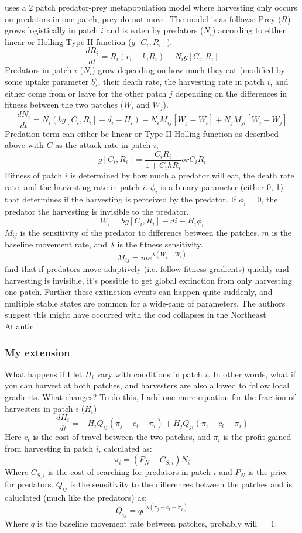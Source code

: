 \documentclass{article}\usepackage{graphicx, color}
\begin{document}
\cite{abramsetal:2012} uses a 2 patch predator-prey metapopulation model where harvesting only occurs on predators in one patch, prey do not move. The model is as follows:
Prey ($R$) grows logistically in patch $i$ and is eaten by predators ($N_i$) according to either linear or Holling Type II function ($g[C_i,R_i]$). 
\[\frac{dR_i}{dt}=R_i(r_i-k_iR_i)-N_ig[C_i,R_i]\]
Predators in patch $i$ ($N_i$) grow depending on how much they eat (modified by some uptake parameter $b$), their death rate, the harvesting rate in patch $i$, and either come from or leave for the other patch $j$ depending on the differences in fitness between the two patches ($W_i$ and $W_j$).
\[\frac{dN_i}{dt}=N_i(bg[C_i,R_i]-d_i-H_i)-N_iM_{ij}[W_j-W_i]+N_jM_{ji}[W_i-W_j]\]
Predation term can either be linear or Type II Holling function as described above with $C$ as the attack rate in patch $i$,
\[g[C_i,R_i]=\frac{C_iR_i}{1+C_ihR_i} or C_iR_i\]
Fitness of patch $i$ is determined by how much a predator will eat, the death rate rate, and the harvesting rate in patch $i$. $\phi_i$ is a binary parameter (either 0, 1) that determines if the harvesting is perceived by the predator. If $\phi_i=0$, the predator the harvesting is invisible to the predator. 
\[W_i = bg[C_i,R_i]-di-H_i\phi_i\]
$M_{ij}$ is the sensitivity of the predator to differencs between the patches. $m$ is the baseline movement rate, and $\lambda$ is the fitness sensitivity. 
\[M_{ij} = me^{\lambda(W_j-W_i)}\]
\cite{abramsetal:2012} find that if predators move adaptively (i.e. follow fitness gradients) quickly and harvesting is invisible, it's possible to get global extinction from only harvesting one patch. Further these extinction events can happen quite suddenly, and multiple stable states are common for a wide-rang of parameters. The authors suggest this might have occurred with the cod collapses in the Northeast Atlantic. 

\subsubsection{My extension}
What happens if I let $H_i$ vary with conditions in patch $i$. In other words, what if you can harvest at both patches, and harvesters are also allowed to follow local gradients. What changes? To do this, I add one more equation for the fraction of harvesters in patch $i$ ($H_i$)
\[\frac{dH_i}{dt}=-H_iQ_{ij}(\pi_j-c_t-\pi_i)+H_jQ_{ji}(\pi_i-c_t-\pi_i)\]
Here $c_t$ is the cost of travel between the two patches, and $\pi_i$ is the profit gained from harvesting in patch $i$, calculated as:
\[\pi_i=(P_N-C_{S,i})N_i\]
Where $C_{S,i}$ is the cost of searching for predators in patch $i$ and $P_N$ is the price for predators. $Q_{ij}$ is the sensitivity to the differences between the patches and is caluclated (much like the predators) as:
\[Q_{ij}=qe^{\lambda(\pi_j-c_t-\pi_I)}\]
Where $q$ is the baseline movement rate between patches, probably will $=1$. 
\end{document}
